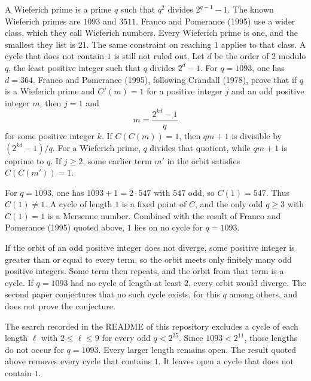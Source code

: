 \documentclass[11pt]{article}
\begin{document}
A Wieferich prime is a prime \(q\) such that \(q^2\) divides \(2^{q-1} - 1\).
The known Wieferich primes are \(1093\) and \(3511\).
Franco and Pomerance (1995) use a wider class, which they call Wieferich numbers.
Every Wieferich prime is one, and the smallest they list is \(21\).
The same constraint on reaching \(1\) applies to that class.
A cycle that does not contain \(1\) is still not ruled out.
Let \(d\) be the order of \(2\) modulo \(q\), the least positive integer such that \(q\) divides \(2^d - 1\).
For \(q = 1093\), one has \(d = 364\).
Franco and Pomerance (1995), following Crandall (1978), prove that if \(q\) is a Wieferich prime and \(C^j(m) = 1\) for a positive integer \(j\) and an odd positive integer \(m\), then \(j = 1\) and
\[
m = \frac{2^{kd} - 1}{q}
\]
for some positive integer \(k\).
If \(C(C(m)) = 1\), then \(qm + 1\) is divisible by \((2^{kd} - 1)/q\).
For a Wieferich prime, \(q\) divides that quotient, while \(qm + 1\) is coprime to \(q\).
If \(j \ge 2\), some earlier term \(m'\) in the orbit satisfies \(C(C(m')) = 1\).

For \(q = 1093\), one has \(1093 + 1 = 2 \cdot 547\) with \(547\) odd, so \(C(1) = 547\).
Thus \(C(1) \ne 1\).
A cycle of length \(1\) is a fixed point of \(C\), and the only odd \(q \ge 3\) with \(C(1) = 1\) is a Mersenne number.
Combined with the result of Franco and Pomerance (1995) quoted above, \(1\) lies on no cycle for \(q = 1093\).

If the orbit of an odd positive integer does not diverge, some positive integer is greater than or equal to every term, so the orbit meets only finitely many odd positive integers.
Some term then repeats, and the orbit from that term is a cycle.
If \(q = 1093\) had no cycle of length at least \(2\), every orbit would diverge.
The second paper conjectures that no such cycle exists, for this \(q\) among others, and does not prove the conjecture.

The search recorded in the README of this repository excludes a cycle of each length \(\ell\) with \(2 \le \ell \le 9\) for every odd \(q < 2^{35}\).
Since \(1093 < 2^{11}\), those lengths do not occur for \(q = 1093\).
Every larger length remains open.
The result quoted above removes every cycle that contains \(1\).
It leaves open a cycle that does not contain \(1\).
\end{document}
